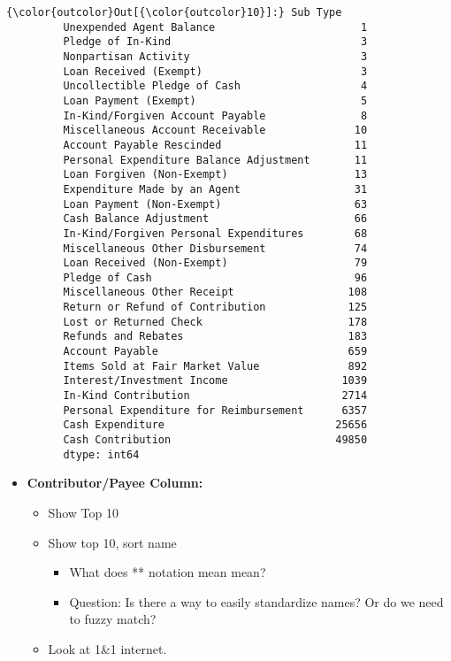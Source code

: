 \documentclass[11pt]{article}
\providecommand{\tightlist}{%
      \setlength{\itemsep}{0pt}\setlength{\parskip}{0pt}}
\begin{document}
\begin{Verbatim}[commandchars=\\\{\}]
{\color{outcolor}Out[{\color{outcolor}10}]:} Sub Type
         Unexpended Agent Balance                       1
         Pledge of In-Kind                              3
         Nonpartisan Activity                           3
         Loan Received (Exempt)                         3
         Uncollectible Pledge of Cash                   4
         Loan Payment (Exempt)                          5
         In-Kind/Forgiven Account Payable               8
         Miscellaneous Account Receivable              10
         Account Payable Rescinded                     11
         Personal Expenditure Balance Adjustment       11
         Loan Forgiven (Non-Exempt)                    13
         Expenditure Made by an Agent                  31
         Loan Payment (Non-Exempt)                     63
         Cash Balance Adjustment                       66
         In-Kind/Forgiven Personal Expenditures        68
         Miscellaneous Other Disbursement              74
         Loan Received (Non-Exempt)                    79
         Pledge of Cash                                96
         Miscellaneous Other Receipt                  108
         Return or Refund of Contribution             125
         Lost or Returned Check                       178
         Refunds and Rebates                          183
         Account Payable                              659
         Items Sold at Fair Market Value              892
         Interest/Investment Income                  1039
         In-Kind Contribution                        2714
         Personal Expenditure for Reimbursement      6357
         Cash Expenditure                           25656
         Cash Contribution                          49850
         dtype: int64
\end{Verbatim}
            
    \begin{itemize}
\tightlist
\item
  \textbf{Contributor/Payee Column:}

  \begin{itemize}
  \tightlist
  \item
    Show Top 10
  \item
    Show top 10, sort name

    \begin{itemize}
    \tightlist
    \item
      What does ** notation mean mean?
    \item
      Question: Is there a way to easily standardize names? Or do we
      need to fuzzy match?
    \end{itemize}
  \item
    Look at 1\&1 internet.
  \end{itemize}
\end{itemize}
\end{document}
